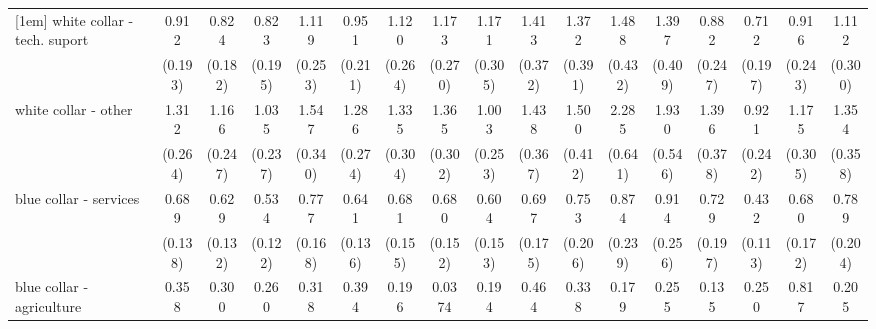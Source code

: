 {\begin{tabular}{l*{16}{c}}
[1em]
white collar - tech. suport&       0.912         &       0.824         &       0.823         &       1.119         &       0.951         &       1.120         &       1.173         &       1.171         &       1.413         &       1.372         &       1.488         &       1.397         &       0.882         &       0.712         &       0.916         &       1.112         \\
                    &     (0.193)         &     (0.182)         &     (0.195)         &     (0.253)         &     (0.211)         &     (0.264)         &     (0.270)         &     (0.305)         &     (0.372)         &     (0.391)         &     (0.432)         &     (0.409)         &     (0.247)         &     (0.197)         &     (0.243)         &     (0.300)         \\
[1em]
white collar - other&       1.312         &       1.166         &       1.035         &       1.547\sym{*}  &       1.286         &       1.335         &       1.365         &       1.003         &       1.438         &       1.500         &       2.285\sym{**} &       1.930\sym{*}  &       1.396         &       0.921         &       1.175         &       1.354         \\
                    &     (0.264)         &     (0.247)         &     (0.237)         &     (0.340)         &     (0.274)         &     (0.304)         &     (0.302)         &     (0.253)         &     (0.367)         &     (0.412)         &     (0.641)         &     (0.546)         &     (0.378)         &     (0.242)         &     (0.305)         &     (0.358)         \\
[1em]
blue collar - services&       0.689         &       0.629\sym{*}  &       0.534\sym{**} &       0.777         &       0.641\sym{*}  &       0.681         &       0.680         &       0.604\sym{*}  &       0.697         &       0.753         &       0.874         &       0.914         &       0.729         &       0.432\sym{**} &       0.680         &       0.789         \\
                    &     (0.138)         &     (0.132)         &     (0.122)         &     (0.168)         &     (0.136)         &     (0.155)         &     (0.152)         &     (0.153)         &     (0.175)         &     (0.206)         &     (0.239)         &     (0.256)         &     (0.197)         &     (0.113)         &     (0.172)         &     (0.204)         \\
[1em]
blue collar - agriculture&       0.358         &       0.300         &       0.260\sym{*}  &       0.318         &       0.394         &       0.196\sym{*}  &      0.0374\sym{***}&       0.194\sym{**} &       0.464         &       0.338         &       0.179\sym{*}  &       0.255         &       0.135\sym{*}  &       0.250\sym{*}  &       0.817         &       0.205\sym{**} \\

\end{tabular}}
